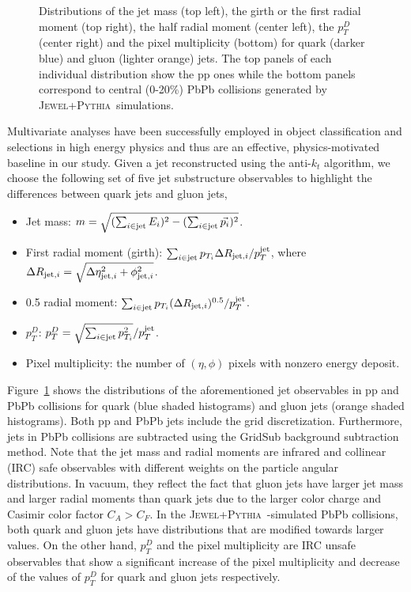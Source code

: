 \documentclass[notoc]{JHEP3}
\newcommand{\jw}{\textsc{Jewel}~}
\newcommand{\jwpy}{\textsc{Jewel+Pythia}~}
\begin{document}
\begin{figure}[h]
	   \caption{Distributions of the jet mass (top left), the girth or the first radial moment (top right), the half radial moment (center left), the $p^{D}_{T}$ (center right) and the pixel multiplicity (bottom) for quark (darker blue) and gluon (lighter orange) jets. The top panels of each individual distribution show the pp ones while the bottom panels correspond to central (0-20\%) PbPb collisions generated by \jwpy simulations.}
	   \label{fig:jetdistributons_pp_pbpb}
	\end{figure}

Multivariate analyses have been successfully employed in object classification and selections in high energy physics \cite{Bhat:2010zz, 1742-6596-608-1-012058} and thus are an effective, physics-motivated baseline in our study. Given a jet reconstructed using the anti-$k_{t}$ algorithm, we choose the following set of five jet substructure observables \cite{Gallicchio:2012ez} to highlight the differences between quark jets and gluon jets,
	\begin{itemize}
		\item Jet mass: $m = \sqrt{(\sum_{i\in {\rm jet}} E_i)^{2} - (\sum_{i\in {\rm jet}} \vec{p_i})^2}$.
	        \item First radial moment (girth): $\sum_{i \in {\rm jet}} p_{T_i} \Delta R_{{\rm jet}, i}/p^{\rm jet}_{T}$, where $\Delta R_{{\rm jet}, i}=\sqrt{\Delta \eta^2_{{\rm jet}, i}+\phi^2_{{\rm jet}, i}}$.
		\item 0.5 radial moment:  $\sum_{i \in {\rm jet}} p_{T_i} (\Delta R_{{\rm jet}, i})^{0.5}/p^{\rm jet}_{T}$.
        		\item $p_{T}^{D}$: $p^{D}_{T} = \sqrt{\sum_{i \in {\rm jet}} {p^2_{T_i}}}/p^{\rm jet}_{T}$.
       		\item Pixel multiplicity: the number of $(\eta,\phi)$ pixels with nonzero energy deposit. %
	\end{itemize}

Figure~\ref{fig:jetdistributons_pp_pbpb} shows the distributions of the aforementioned jet observables in pp and PbPb collisions for quark (blue shaded histograms) and gluon jets (orange shaded histograms). Both pp and PbPb jets include the grid discretization. Furthermore, jets in PbPb collisions are subtracted using the GridSub background subtraction method. Note that the jet mass and radial moments are infrared and collinear (IRC) safe observables with different weights on the particle angular distributions. In vacuum, they reflect the fact that gluon jets have larger jet mass and larger radial moments than quark jets due to the larger color charge and Casimir color factor $C_A>C_F$. In the \jwpy-simulated PbPb collisions, both quark and gluon jets have distributions that are modified towards larger values. On the other hand, $p_T^D$ and the pixel multiplicity are IRC unsafe observables that show a significant increase of the pixel multiplicity and decrease of the values of $p_T^D$ for quark and gluon jets respectively. %
\end{document}
